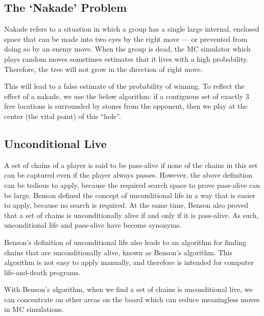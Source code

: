 \subsection{The `Nakade' Problem}

Nakade refers to a situation in which a group has a single large internal, enclosed space that can be made into two eyes by the right move --- or prevented from doing so by an enemy move. When the group is dead, the MC simulator which plays random moves sometimes estimates that it lives with a high probability. Therefore, the tree will not grow in the direction of right move. 

This will lead to a false estimate of the probability of winning. To reflect the effect of a nakade, we use the below algorithm\cite{chaslot_combiningexpert}: if a contiguous set of exactly 3 free locations is surrounded by stones from the opponent, then we play at the center (the vital point) of this ``hole''.

\subsection{Unconditional Live}

A set of chains of a player is said to be pass-alive if none of the chains in this set can be captured even if the player always passes. However, the above definition can be tedious to apply, because the required search space to prove pass-alive can be large. Benson \cite{benson1976life} defined the concept of unconditional life in a way that is easier to apply, because no search is required. At the same time, Benson also proved that a set of chains is unconditionally alive if and only if it is pass-alive. As such, unconditional life and pass-alive have become synonyms.

Benson's definition of unconditional life also leads to an algorithm for finding chains that are unconditionally alive, known as Benson's algorithm. This algorithm is not easy to apply manually, and therefore is intended for computer life-and-death programs.

With Benson's algorithm, when we find a set of chains is unconditional live, we can concentrate on other areas on the board which can reduce meaningless moves in MC simulations. 
